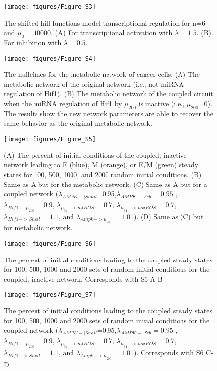 \documentclass{article}
\begin{document}
\begin{figure}
\texttt{[image: figures/Figure\_S3]}
\caption{The shifted hill functions model transcriptional regulation for n=6 and $\mu_0=10000$. (A) For transcriptional activation with $\lambda = 1.5$. (B) For inhibition with $\lambda=0.5$.}
\end{figure}


\begin{figure}
\texttt{[image: figures/Figure\_S4]}
\caption{The nullclines for the metabolic network of cancer cells. (A) The metabolic network of the original network (i.e., not miRNA regulation of Hif1). (B) The metabolic network of the coupled circuit when the miRNA regulation of Hif1 by $\mu_{200}$ is inactive (i.e., $\mu_{200}$=0). The results show the new network parameters are able to recover the same behavior as the original metabolic network.}
\end{figure}

\begin{figure}
\texttt{[image: figures/Figure\_S5]}
\caption{(A) The percent of initial conditions of the coupled, inactive network leading to E (blue), M (orange), or E/M (green) steady states for 100, 500, 1000, and 2000 random initial conditions. (B) Same as A but for the metabolic network. (C) Same as A but for a coupled network ($\lambda_{AMPK-|Snail}$=0.95,$\lambda_{AMPK-|Zeb}=0.95$ , $\lambda_{Hif1-|\mu_{200}}=0.9$, $\lambda_{\mu_{34}->mtROS}=0.7$, $\lambda_{\mu_{34}->noxROS}=0.7$, $\lambda_{Hif1->Snail}=1.1$, and $\lambda_{Ampk->\mu_{200}} = 1.01$). (D) Same as (C) but for metabolic network.}
\end{figure}


\begin{figure}
\texttt{[image: figures/Figure\_S6]}
\caption{The percent of initial conditions leading to the coupled steady states for 100, 500, 1000 and 2000 sets of random initial conditions for the coupled, inactive network. Corresponds with S6 A-B}
\end{figure}

\begin{figure}
\texttt{[image: figures/Figure\_S7]}
\caption{The percent of initial conditions leading to the coupled steady states for 100, 500, 1000 and 2000 sets of random initial conditions for the coupled network ($\lambda_{AMPK-|Snail}$=0.95,$\lambda_{AMPK-|Zeb}=0.95$ , $\lambda_{Hif1-|\mu_{200}}=0.9$, $\lambda_{\mu_{34}->mtROS}=0.7$, $\lambda_{\mu_{34}->noxROS}=0.7$, $\lambda_{Hif1->Snail}=1.1$, and $\lambda_{Ampk->\mu_{200}} = 1.01$). Corresponds with S6 C-D }
\end{figure}
\end{document}
